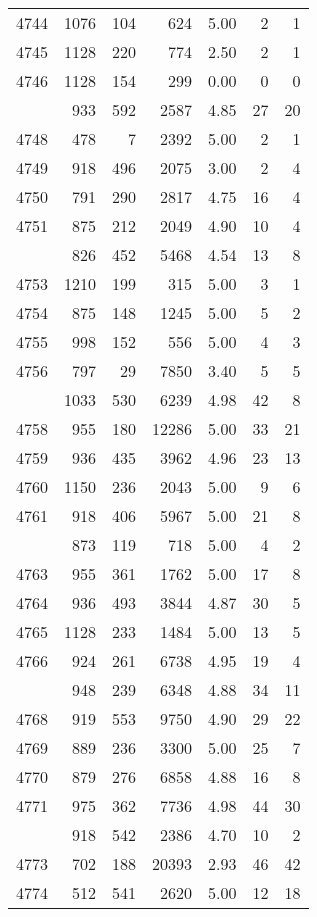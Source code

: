 \documentclass[
]{article}
\begin{document}
\begin{table}
\begin{tabular}[t]{lrrrrrr}
4744 & 1076 & 104 & 624 & 5.00 & 2 & 1\\
4745 & 1128 & 220 & 774 & 2.50 & 2 & 1\\
4746 & 1128 & 154 & 299 & 0.00 & 0 & 0\\
\addlinespace
4747 & 933 & 592 & 2587 & 4.85 & 27 & 20\\
4748 & 478 & 7 & 2392 & 5.00 & 2 & 1\\
4749 & 918 & 496 & 2075 & 3.00 & 2 & 4\\
4750 & 791 & 290 & 2817 & 4.75 & 16 & 4\\
4751 & 875 & 212 & 2049 & 4.90 & 10 & 4\\
\addlinespace
4752 & 826 & 452 & 5468 & 4.54 & 13 & 8\\
4753 & 1210 & 199 & 315 & 5.00 & 3 & 1\\
4754 & 875 & 148 & 1245 & 5.00 & 5 & 2\\
4755 & 998 & 152 & 556 & 5.00 & 4 & 3\\
4756 & 797 & 29 & 7850 & 3.40 & 5 & 5\\
\addlinespace
4757 & 1033 & 530 & 6239 & 4.98 & 42 & 8\\
4758 & 955 & 180 & 12286 & 5.00 & 33 & 21\\
4759 & 936 & 435 & 3962 & 4.96 & 23 & 13\\
4760 & 1150 & 236 & 2043 & 5.00 & 9 & 6\\
4761 & 918 & 406 & 5967 & 5.00 & 21 & 8\\
\addlinespace
4762 & 873 & 119 & 718 & 5.00 & 4 & 2\\
4763 & 955 & 361 & 1762 & 5.00 & 17 & 8\\
4764 & 936 & 493 & 3844 & 4.87 & 30 & 5\\
4765 & 1128 & 233 & 1484 & 5.00 & 13 & 5\\
4766 & 924 & 261 & 6738 & 4.95 & 19 & 4\\
\addlinespace
4767 & 948 & 239 & 6348 & 4.88 & 34 & 11\\
4768 & 919 & 553 & 9750 & 4.90 & 29 & 22\\
4769 & 889 & 236 & 3300 & 5.00 & 25 & 7\\
4770 & 879 & 276 & 6858 & 4.88 & 16 & 8\\
4771 & 975 & 362 & 7736 & 4.98 & 44 & 30\\
\addlinespace
4772 & 918 & 542 & 2386 & 4.70 & 10 & 2\\
4773 & 702 & 188 & 20393 & 2.93 & 46 & 42\\
4774 & 512 & 541 & 2620 & 5.00 & 12 & 18\\

\end{tabular}
\end{table}
\end{document}
